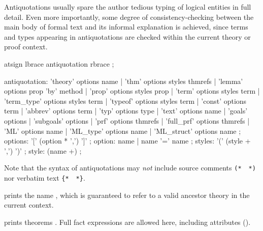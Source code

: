 \begin{isabellebody}
\begin{isamarkuptext}
  Antiquotations usually spare the author tedious typing of logical
  entities in full detail.  Even more importantly, some degree of
  consistency-checking between the main body of formal text and its
  informal explanation is achieved, since terms and types appearing in
  antiquotations are checked within the current theory or proof
  context.

  \begin{rail}
    atsign lbrace antiquotation rbrace
    ;

    antiquotation:
      'theory' options name |
      'thm' options styles thmrefs |
      'lemma' options prop 'by' method |
      'prop' options styles prop |
      'term' options styles term |
      'term_type' options styles term |
      'typeof' options styles term |
      'const' options term |
      'abbrev' options term |
      'typ' options type |
      'text' options name |
      'goals' options |
      'subgoals' options |
      'prf' options thmrefs |
      'full\_prf' options thmrefs |
      'ML' options name |
      'ML\_type' options name |
      'ML\_struct' options name
    ;
    options: '[' (option * ',') ']'
    ;
    option: name | name '=' name
    ;
    styles: '(' (style + ',') ')'
    ;
    style: (name +)
    ;
  \end{rail}

  Note that the syntax of antiquotations may \emph{not} include source
  comments \verb|(*|~\isa{{\isachardoublequote}{\isasymdots}{\isachardoublequote}}~\verb|*)| nor verbatim
  text \verb|{|\verb|*|~\isa{{\isachardoublequote}{\isasymdots}{\isachardoublequote}}~\verb|*|\verb|}|.

  \begin{description}
  
  \item {} prints the name , which is
  guaranteed to refer to a valid ancestor theory in the current
  context.

  \item {} prints theorems .
  Full fact expressions are allowed here, including attributes
  ().


\end{description}
\end{isamarkuptext}
\end{isabellebody}
